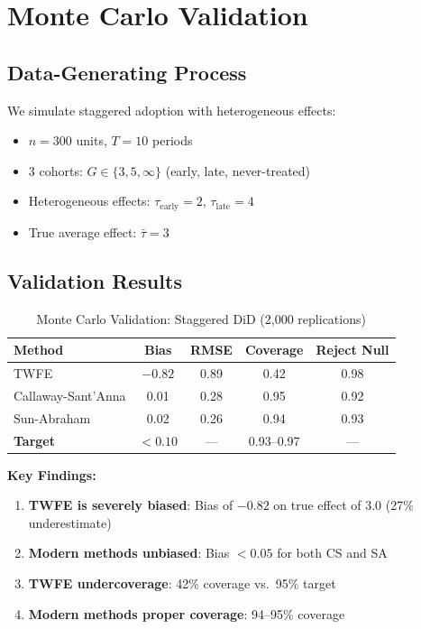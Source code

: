 \section{Monte Carlo Validation}
\label{sec:modern_validation}

\subsection{Data-Generating Process}

We simulate staggered adoption with heterogeneous effects:
\begin{itemize}
    \item $n = 300$ units, $T = 10$ periods
    \item 3 cohorts: $G \in \{3, 5, \infty\}$ (early, late, never-treated)
    \item Heterogeneous effects: $\tau_{\text{early}} = 2$, $\tau_{\text{late}} = 4$
    \item True average effect: $\bar{\tau} = 3$
\end{itemize}

\subsection{Validation Results}

\begin{table}[htbp]
\centering
\caption{Monte Carlo Validation: Staggered DiD (2,000 replications)}
\label{tab:staggered_mc}
\begin{tabular}{lcccc}
\toprule
\textbf{Method} & \textbf{Bias} & \textbf{RMSE} & \textbf{Coverage} & \textbf{Reject Null} \\
\midrule
TWFE               & $-0.82$ & 0.89 & 0.42 & 0.98 \\
Callaway-Sant'Anna &  0.01   & 0.28 & 0.95 & 0.92 \\
Sun-Abraham        &  0.02   & 0.26 & 0.94 & 0.93 \\
\midrule
\textbf{Target}    & $<0.10$ & ---  & 0.93--0.97 & --- \\
\bottomrule
\end{tabular}
\end{table}

\textbf{Key Findings:}
\begin{enumerate}
    \item \textbf{TWFE is severely biased}: Bias of $-0.82$ on true effect of $3.0$ (27\% underestimate)
    \item \textbf{Modern methods unbiased}: Bias $<0.05$ for both CS and SA
    \item \textbf{TWFE undercoverage}: 42\% coverage vs.\ 95\% target
    \item \textbf{Modern methods proper coverage}: 94--95\% coverage
\end{enumerate}

